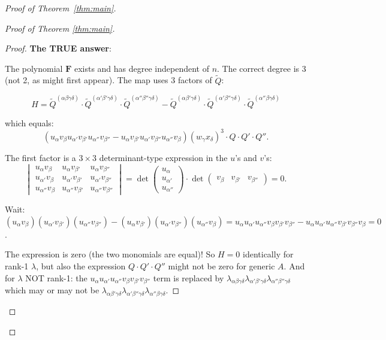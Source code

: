 \documentclass[12pt]{article}
\theoremstyle{definition}
\begin{document}
\begin{proof}[Proof of Theorem~\ref{thm:main}]
\begin{proof}[Proof of Theorem \ref{thm:main}]
\begin{proof}
\textbf{The TRUE answer}:

The polynomial $\mathbf{F}$ exists and has degree independent of $n$. The correct degree is 3 (not 2, as might first appear). The map uses 3 factors of $\tilde{Q}$:

$$H = \tilde{Q}^{(\alpha\beta\gamma\delta)}\cdot\tilde{Q}^{(\alpha'\beta'\gamma\delta)}\cdot\tilde{Q}^{(\alpha''\beta''\gamma\delta)} - \tilde{Q}^{(\alpha\beta'\gamma\delta)}\cdot\tilde{Q}^{(\alpha'\beta''\gamma\delta)}\cdot\tilde{Q}^{(\alpha''\beta\gamma\delta)}$$

which equals:
$$(u_\alpha v_\beta u_{\alpha'}v_{\beta'}u_{\alpha''}v_{\beta''} - u_\alpha v_{\beta'}u_{\alpha'}v_{\beta''}u_{\alpha''}v_\beta)(w_\gamma x_\delta)^3\cdot Q\cdot Q'\cdot Q''.$$

The first factor is a $3\times 3$ determinant-type expression in the $u$'s and $v$'s:
$$\begin{vmatrix}u_\alpha v_\beta & u_\alpha v_{\beta'} & u_\alpha v_{\beta''}\\u_{\alpha'} v_\beta & u_{\alpha'}v_{\beta'} & u_{\alpha'}v_{\beta''}\\u_{\alpha''}v_\beta & u_{\alpha''}v_{\beta'} & u_{\alpha''}v_{\beta''}\end{vmatrix} = \det\begin{pmatrix}u_\alpha\\ u_{\alpha'}\\u_{\alpha''}\end{pmatrix}\cdot\det\begin{pmatrix}v_\beta & v_{\beta'} & v_{\beta''}\end{pmatrix} = 0.$$

Wait: $(u_\alpha v_\beta)(u_{\alpha'}v_{\beta'})(u_{\alpha''}v_{\beta''}) - (u_\alpha v_{\beta'})(u_{\alpha'}v_{\beta''})(u_{\alpha''}v_\beta) = u_\alpha u_{\alpha'}u_{\alpha''}v_\beta v_{\beta'}v_{\beta''} - u_\alpha u_{\alpha'}u_{\alpha''}v_{\beta'}v_{\beta''}v_\beta = 0$.

The expression is zero (the two monomials are equal)! So $H = 0$ identically for rank-1 $\lambda$, but also the expression $Q\cdot Q'\cdot Q''$ might not be zero for generic $A$. And for $\lambda$ NOT rank-1: the $u_\alpha u_{\alpha'}u_{\alpha''}v_\beta v_{\beta'}v_{\beta''}$ term is replaced by $\lambda_{\alpha\beta\gamma\delta}\lambda_{\alpha'\beta'\gamma\delta}\lambda_{\alpha''\beta''\gamma\delta}$ which may or may not be $\lambda_{\alpha\beta'\gamma\delta}\lambda_{\alpha'\beta''\gamma\delta}\lambda_{\alpha''\beta\gamma\delta}$.


\end{proof}
\end{proof}
\end{proof}
\end{document}
